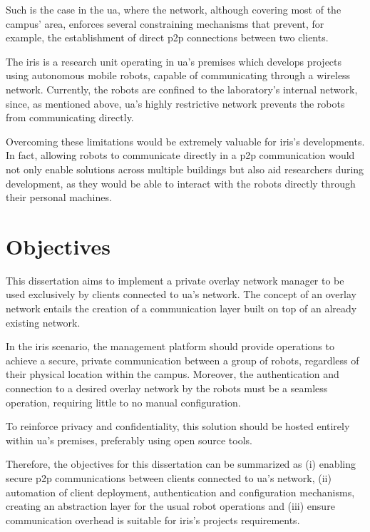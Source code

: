 \documentclass[11pt,twoside,a4paper]{report}
\begin{document}
Such is the case in the \ac{ua}, where the network, although covering most of the campus' area, enforces several constraining mechanisms that prevent, for example, the establishment of direct \ac{p2p} connections between two clients.

The \ac{iris} is a research unit operating in \ac{ua}'s premises which develops projects using autonomous mobile robots, capable of communicating through a wireless network. Currently, the robots are confined to the laboratory's internal network, since, as mentioned above, \ac{ua}'s highly restrictive network prevents the robots from communicating directly.

Overcoming these limitations would be extremely valuable for \ac{iris}'s developments. In fact, allowing robots to communicate directly in a \ac{p2p} communication would not only enable solutions across multiple buildings but also aid researchers during development, as they would be able to interact with the robots directly through their personal machines.

\section{Objectives}
\label{sec:obj}

This dissertation aims to implement a private overlay network manager to be used exclusively by clients connected to \ac{ua}'s network. The concept of an overlay network entails the creation of a communication layer built on top of an already existing network.

In the \ac{iris} scenario, the management platform should provide operations to achieve a secure, private communication between a group of robots, regardless of their physical location within the campus. Moreover, the authentication and connection to a desired overlay network by the robots must be a seamless operation, requiring little to no manual configuration.

To reinforce privacy and confidentiality, this solution should be hosted entirely within \ac{ua}'s premises, preferably using open source tools.

Therefore, the objectives for this dissertation can be summarized as (i) enabling secure \ac{p2p} communications between clients connected to \ac{ua}'s network, (ii) automation of client deployment, authentication and configuration mechanisms, creating an abstraction layer for the usual robot operations and (iii) ensure communication overhead is suitable for \ac{iris}'s projects requirements.
\end{document}
